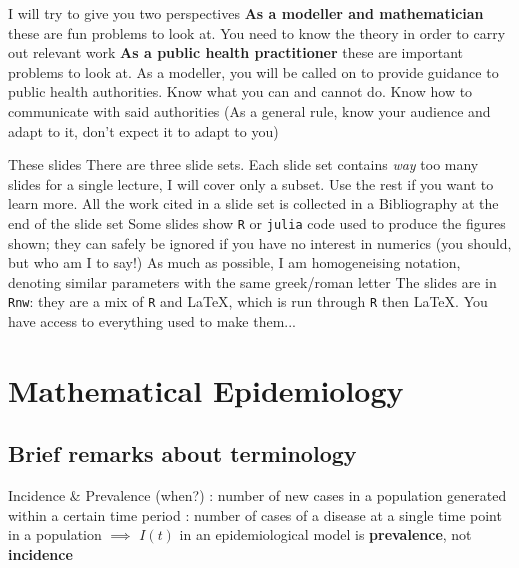 \documentclass[aspectratio=169]{beamer}\usepackage[]{graphicx}\usepackage[]{xcolor}
\begin{document}
\begin{frame}{I will try to give you two perspectives}
\bbullet\textbf{As a modeller and mathematician} these are fun problems to look at. You need to know the theory in order to carry out relevant work
\vfill
\bbullet\textbf{As a public health practitioner} these are important problems to look at.
As a modeller, you will be called on to provide guidance to public health authorities. Know what you can and cannot do. Know how to communicate with said authorities
\vfill
(As a general rule, know your audience and adapt to it, don't expect it to adapt to you)
\end{frame}

\begin{frame}{These slides}
\bbullet There are three slide sets. Each slide set contains \emph{way} too many slides for a single lecture, I will cover only a subset. Use the rest if you want to learn more. All the work cited in a slide set is collected in a Bibliography at the end of the slide set
\vfill
\bbullet Some slides show \texttt{R} or \texttt{julia} code used to produce the figures shown; they can safely be ignored if you have no interest in numerics (you should, but who am I to say!)
\vfill
\bbullet As much as possible, I am homogeneising notation, denoting similar parameters with the same greek/roman letter
\vfill
\bbullet The slides are in \texttt{Rnw}: they are a mix of \texttt{R} and \LaTeX, which is run through \texttt{R} then \LaTeX. You have access to everything used to make them...
\end{frame}

\section{Mathematical Epidemiology}

\subsection{Brief remarks about terminology}

\nocite{MilwidSteriuArinoHeffernanEtAl2016}

\begin{frame}{Incidence \& Prevalence (when?)}
: number of new cases in a population generated within a certain time period
\vfill
{}: number of cases of a disease at a single time point in a population
\vfill
$\implies$ $I(t)$ in an epidemiological model is \textbf{prevalence}, not \textbf{incidence}
\end{frame}
\end{document}
